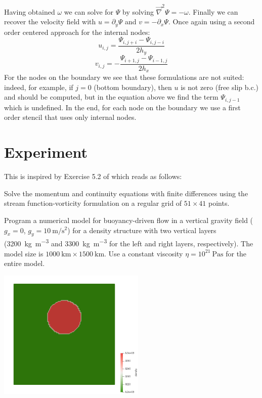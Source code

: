 Having obtained $\omega$ we can solve for $\Psi$ by solving
$\vec\nabla^2 \Psi = -\omega$.
Finally we can recover the velocity field with $u=\partial_y \Psi$ and $v=-\partial_x \Psi$.
Once again using a second order centered approach for the internal nodes:
\[
u_{i,j} = \frac{\Psi_{i,j+i}-\Psi_{i,j-i}}{2 h_y}
\]
\[
v_{i,j} = - \frac{\Psi_{i+1,j}-\Psi_{i-1,j}}{2 h_x}
\]
For the nodes on the boundary we see that these formulations are not suited:
indeed, for example, if $j=0$ (bottom boundary), then $u$ is not zero (free slip b.c.)
and should be computed, but in the equation above we find the term $\Psi_{i,j-1}$ 
which is undefined. In the end, 
for each node on the boundary we use a first order stencil that uses only 
internal nodes.

\section*{Experiment}

This is inspired by Exercise 5.2 of \textcite{gery19book} which reads as 
follows:

Solve the momentum and continuity equations with ﬁnite differences using the stream
function-vorticity formulation 
on a regular grid of $51\times 41$ points. 

Program a numerical model for buoyancy-driven ﬂow in a vertical 
gravity ﬁeld ($g_x=0$, $g_y=10~\si{\meter\per\square\second}$) 
for a density structure with two vertical layers 
(3200~\si{\kg\per\cubic\meter} and 3300~\si{\kg\per\cubic\meter} 
for the left and right layers, respectively). The model size is 
$1000~\si{\km} \times 1500~\si{\km}$.
Use a constant viscosity $\eta = 10^{21}~\si{\pascal\second}$ 
for the entire model.

\begin{center}
\includegraphics[width=7cm]{python_codes/fieldstone_153/results/exp1/rho}
\end{center}


